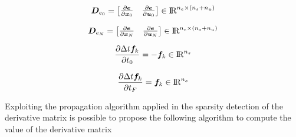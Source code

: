\documentclass[12pt]{article}
\newcommand{\real}{\mbox{\rm I$\!$R}}
\begin{document}
\begin{equation}
    \bm{D}_{e_0}= 
    \begin{bmatrix}
     \frac{\partial \bm{e}}{\partial \bm{x}_0} & \frac{\partial \bm{e}}{\partial \bm{u}_0} 
    \end{bmatrix} \in \real^{n_e \times (n_s+n_u)}
\end{equation}

\begin{equation}
    \bm{D}_{e_N}= 
    \begin{bmatrix}
     \frac{\partial \bm{e}}{\partial \bm{x}_N} & \frac{\partial \bm{e}}{\partial \bm{u}_N} 
    \end{bmatrix} \in \real^{n_e \times (n_s+n_u)}
\end{equation}

\begin{equation}
    \frac{\partial \Delta t \bm{f}_k}{\partial t_0}=-\bm{f}_k \in \real^{n_s}
\end{equation}

\begin{equation}
    \frac{\partial \Delta t \bm{f}_k}{\partial t_F}=\bm{f}_k \in \real^{n_s}
\end{equation}

Exploiting the propagation algorithm applied in the sparsity detection of the derivative matrix is possible to propose the following algorithm to compute the value of the derivative matrix
\end{document}
